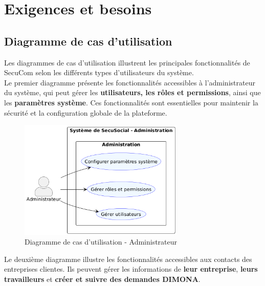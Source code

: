 \chapter{Exigences et besoins}

\section{Diagramme de cas d'utilisation}

Les diagrammes de cas d'utilisation illustrent les principales fonctionnalités de SecuCom selon les différents types d'utilisateurs du système.\\

\noindent Le premier diagramme présente les fonctionnalités accessibles à l'administrateur du système, qui peut gérer les \textbf{utilisateurs, les rôles et permissions}, ainsi que les \textbf{paramètres système}. Ces fonctionnalités sont essentielles pour maintenir la sécurité et la configuration globale de la plateforme.

\vspace{1cm}
\begin{figure}[h]
\centering
\includegraphics[width=0.7\textwidth]{AdminUC.png}
\caption{Diagramme de cas d'utilisation - Administrateur}
\end{figure}

\vspace{0.5cm}

\noindent Le deuxième diagramme illustre les fonctionnalités accessibles aux contacts des entreprises clientes. Ils peuvent gérer les informations de \textbf{leur entreprise}, \textbf{leurs travailleurs} et \textbf{créer et suivre des demandes DIMONA}.
\newpage

